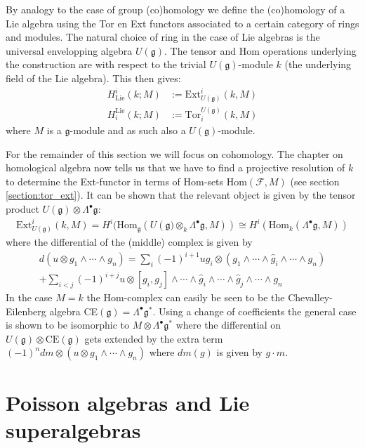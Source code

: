 	By analogy to the case of group (co)homology we define the (co)homology of a Lie algebra using the Tor en Ext functors associated to a certain category of rings and modules. The natural choice of ring in the case of Lie algebras is the universal envelopping algebra $U(\mathfrak{g})$. The tensor and Hom operations underlying the construction are with respect to the trivial $U(\mathfrak{g})$-module $k$ (the underlying field of the Lie algebra). This then gives:
	\begin{align}
		H^i_{\text{Lie}}(k;M) &:= \text{Ext}^i_{U(\mathfrak{g})}(k,M)\\
		H_i^{\text{Lie}}(k;M) &:= \text{Tor}_i^{U(\mathfrak{g})}(k,M)
	\end{align}
	where $M$ is a $\mathfrak{g}$-module and as such also a $U(\mathfrak{g})$-module.
	
	For the remainder of this section we will focus on cohomology. The chapter on homological algebra now tells us that we have to find a projective resolution of $k$ to determine the Ext-functor in terms of Hom-sets Hom$(\mathcal{F}, M)$ (see section \ref{section:tor_ext}). It can be shown that the relevant object is given by the tensor product $U(\mathfrak{g})\otimes\Lambda^\bullet\mathfrak{g}$:
	\begin{gather}
		\text{Ext}^i_{U(\mathfrak{g})}(k, M) = H^i(\text{Hom}_{\mathfrak{g}}(U(\mathfrak{g)}\otimes_k\Lambda^\bullet\mathfrak{g}, M)) \cong H^i(\text{Hom}_k(\Lambda^\bullet\mathfrak{g}, M))
	\end{gather}
	where the differential of the (middle) complex is given by
	\begin{gather}
		d(u\otimes g_1\wedge\cdots\wedge g_n) = \sum_i(-1)^{i+1}ug_i\otimes(g_1\wedge\cdots\wedge\hat{g}_i\wedge\cdots\wedge g_n)\\+ \sum_{i<j}(-1)^{i+j}u\otimes[g_i,g_j]\wedge\cdots\wedge\hat{g}_i\wedge\cdots\wedge\hat{g}_j\wedge\cdots\wedge g_n\nonumber
	\end{gather}
	In the case $M=k$ the Hom-complex can easily be seen to be the Chevalley-Eilenberg algebra CE$(\mathfrak{g})=\Lambda^\bullet\mathfrak{g}^*$. Using a change of coefficients the general case is shown to be isomorphic to $M\otimes\Lambda^\bullet\mathfrak{g}^*$ where the differential on $U(\mathfrak{g})\otimes\text{CE}(\mathfrak{g})$ gets extended by the extra term $(-1)^n dm\otimes (u\otimes g_1\wedge\cdots\wedge g_n)$ where $dm(g)$ is given by $g\cdot m$.

\section{Poisson algebras and Lie superalgebras}


